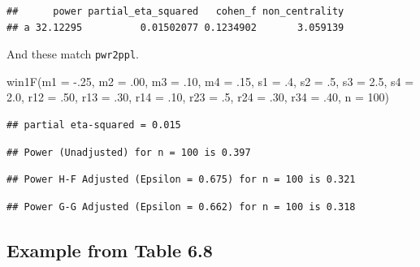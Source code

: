 \documentclass[
]{book}
\newenvironment{Shaded}{\begin{snugshade}}{\end{snugshade}}
\newcommand{\AttributeTok}[1]{\textcolor[rgb]{0.77,0.63,0.00}{#1}}
\newcommand{\DecValTok}[1]{\textcolor[rgb]{0.00,0.00,0.81}{#1}}
\newcommand{\FloatTok}[1]{\textcolor[rgb]{0.00,0.00,0.81}{#1}}
\newcommand{\FunctionTok}[1]{\textcolor[rgb]{0.00,0.00,0.00}{#1}}
\newcommand{\NormalTok}[1]{#1}
\newcommand{\SpecialCharTok}[1]{\textcolor[rgb]{0.00,0.00,0.00}{#1}}
\begin{document}
\begin{verbatim}
##      power partial_eta_squared   cohen_f non_centrality
## a 32.12295          0.01502077 0.1234902       3.059139
\end{verbatim}

And these match \texttt{pwr2ppl}.

\begin{Shaded}
\begin{Highlighting}[]
\FunctionTok{win1F}\NormalTok{(}\AttributeTok{m1 =} \SpecialCharTok{{-}}\NormalTok{.}\DecValTok{25}\NormalTok{, }\AttributeTok{m2 =}\NormalTok{ .}\DecValTok{00}\NormalTok{, }\AttributeTok{m3 =}\NormalTok{ .}\DecValTok{10}\NormalTok{, }\AttributeTok{m4 =}\NormalTok{ .}\DecValTok{15}\NormalTok{,}
      \AttributeTok{s1 =}\NormalTok{ .}\DecValTok{4}\NormalTok{, }\AttributeTok{s2 =}\NormalTok{ .}\DecValTok{5}\NormalTok{, }\AttributeTok{s3 =} \FloatTok{2.5}\NormalTok{, }\AttributeTok{s4 =} \FloatTok{2.0}\NormalTok{,}
      \AttributeTok{r12 =}\NormalTok{ .}\DecValTok{50}\NormalTok{, }\AttributeTok{r13 =}\NormalTok{ .}\DecValTok{30}\NormalTok{, }\AttributeTok{r14 =}\NormalTok{ .}\DecValTok{10}\NormalTok{,}
      \AttributeTok{r23 =}\NormalTok{ .}\DecValTok{5}\NormalTok{, }\AttributeTok{r24 =}\NormalTok{ .}\DecValTok{30}\NormalTok{, }\AttributeTok{r34 =}\NormalTok{ .}\DecValTok{40}\NormalTok{,}
      \AttributeTok{n =} \DecValTok{100}\NormalTok{)}
\end{Highlighting}
\end{Shaded}

\begin{verbatim}
## partial eta-squared = 0.015
\end{verbatim}

\begin{verbatim}
## Power (Unadjusted) for n = 100 is 0.397
\end{verbatim}

\begin{verbatim}
## Power H-F Adjusted (Epsilon = 0.675) for n = 100 is 0.321
\end{verbatim}

\begin{verbatim}
## Power G-G Adjusted (Epsilon = 0.662) for n = 100 is 0.318
\end{verbatim}

\hypertarget{example-from-table-6.8}{%
\subsection{Example from Table 6.8}\label{example-from-table-6.8}}
\end{document}
